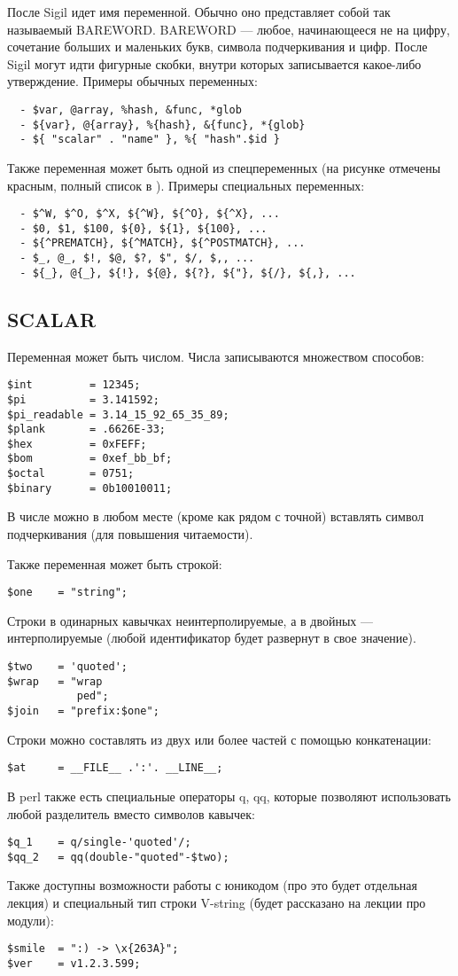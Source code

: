 После Sigil идет имя переменной. Обычно оно представляет собой так называемый BAREWORD. BAREWORD --- любое, начинающееся не на цифру, сочетание больших и маленьких букв, символа подчеркивания и цифр. После Sigil могут идти фигурные скобки, внутри которых записывается какое-либо утверждение. Примеры обычных переменных:
\begin{verbatim}
  - $var, @array, %hash, &func, *glob
  - ${var}, @{array}, %{hash}, &{func}, *{glob}
  - ${ "scalar" . "name" }, %{ "hash".$id }
\end{verbatim}
Также переменная может быть одной из спецпеременных (на рисунке отмечены красным, полный список в ). Примеры специальных переменных:
\begin{verbatim}
  - $^W, $^O, $^X, ${^W}, ${^O}, ${^X}, ...
  - $0, $1, $100, ${0}, ${1}, ${100}, ...
  - ${^PREMATCH}, ${^MATCH}, ${^POSTMATCH}, ...
  - $_, @_, $!, $@, $?, $", $/, $,, ...
  - ${_}, @{_}, ${!}, ${@}, ${?}, ${"}, ${/}, ${,}, ...
\end{verbatim}

\subsection{SCALAR}
Переменная может быть числом. Числа записываются множеством способов:
\begin{verbatim}
$int         = 12345;
$pi          = 3.141592;
$pi_readable = 3.14_15_92_65_35_89;
$plank       = .6626E-33;
$hex         = 0xFEFF;
$bom         = 0xef_bb_bf;
$octal       = 0751;
$binary      = 0b10010011;
\end{verbatim}
В числе можно в любом месте (кроме как рядом с точной) вставлять символ подчеркивания (для повышения читаемости).

Также переменная может быть строкой:
\begin{verbatim}
$one    = "string";
\end{verbatim}
Строки в одинарных кавычках неинтерполируемые, а в двойных --- интерполируемые (любой идентификатор будет развернут в свое значение).
\begin{verbatim}
$two    = 'quoted';
$wrap   = "wrap
           ped";
$join   = "prefix:$one";
\end{verbatim}
Строки можно составлять из двух или более частей с помощью конкатенации:
\begin{verbatim}
$at     = __FILE__ .':'. __LINE__;
\end{verbatim}
В perl также есть специальные операторы q, qq, которые позволяют использовать любой разделитель вместо символов кавычек:
\begin{verbatim}
$q_1    = q/single-'quoted'/;
$qq_2   = qq(double-"quoted"-$two);
\end{verbatim}
Также доступны возможности работы с юникодом (про это будет отдельная лекция) и специальный тип строки V-string (будет рассказано на лекции про модули):
\begin{verbatim}
$smile  = ":) -> \x{263A}";
$ver    = v1.2.3.599;
\end{verbatim}

